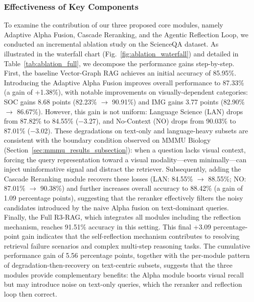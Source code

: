 \documentclass[a4paper, fleqn]{cas-dc}
\begin{document}
\subsubsection{Effectiveness of Key Components}
To examine the contribution of our three proposed core modules, namely Adaptive Alpha Fusion, Cascade Reranking, and the Agentic Reflection Loop, we conducted an incremental ablation study on the ScienceQA dataset.
As illustrated in the waterfall chart (Fig.~\ref{fig:ablation_waterfall}) and detailed in Table~\ref{tab:ablation_full}, we decompose the performance gains step-by-step.
First, the baseline Vector-Graph RAG achieves an initial accuracy of 85.95\%.
Introducing the Adaptive Alpha Fusion improves overall performance to 87.33\% (a gain of +1.38\%), with notable improvements on visually-dependent categories: SOC gains 8.68 points (82.23\% $\to$ 90.91\%) and IMG gains 3.77 points (82.90\% $\to$ 86.67\%).
However, this gain is not uniform: Language Science (LAN) drops from 87.82\% to 84.55\% ($-$3.27), and No-Context (NO) drops from 90.03\% to 87.01\% ($-$3.02).
These degradations on text-only and language-heavy subsets are consistent with the boundary condition observed on MMMU Biology (Section~\ref{sec:mmmu_results_subsection}): when a question lacks visual context, forcing the query representation toward a visual modality---even minimally---can inject uninformative signal and distract the retriever.
Subsequently, adding the Cascade Reranking module recovers these losses (LAN: 84.55\% $\to$ 88.55\%; NO: 87.01\% $\to$ 90.38\%) and further increases overall accuracy to 88.42\% (a gain of 1.09 percentage points), suggesting that the reranker effectively filters the noisy candidates introduced by the naive Alpha fusion on text-dominant queries.
Finally, the Full R3-RAG, which integrates all modules including the reflection mechanism, reaches 91.51\% accuracy in this setting.
This final +3.09 percentage-point gain indicates that the self-reflection mechanism contributes to resolving retrieval failure scenarios and complex multi-step reasoning tasks.
The cumulative performance gain of 5.56 percentage points, together with the per-module pattern of degradation-then-recovery on text-centric subsets, suggests that the three modules provide complementary benefits: the Alpha module boosts visual recall but may introduce noise on text-only queries, which the reranker and reflection loop then correct.
\end{document}

